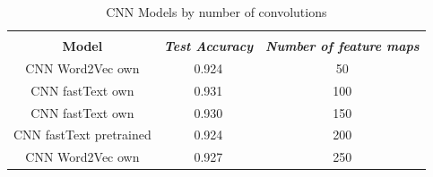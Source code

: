 \documentclass[conference]{IEEEtran}
\begin{document}
\begin{table}[htbp]
\caption{CNN Models by number of convolutions}
\begin{center}
\begin{tabular}{|c|c|c|}
\hline
\textbf{}&\multicolumn{2}{|c|}{\textbf{}} \\ 
\cline{2-3}
\textbf{Model} & \textbf{\textit{Test Accuracy}}& \textbf{\textit{Number of feature maps}} \\ 
\hline
CNN Word2Vec own & 0.924 & 50 \\ 
\hline
CNN fastText own & 0.931 & 100 \\ 
\hline
CNN fastText own & 0.930& 150 \\ 
\hline
CNN fastText pretrained & 0.924 & 200 \\ 
\hline
CNN Word2Vec own & 0.927 & 250 \\ 
\hline
\end{tabular}
\label{tabfmaps}
\end{center}
\end{table}


\label{FirstAppendix}
\end{document}
